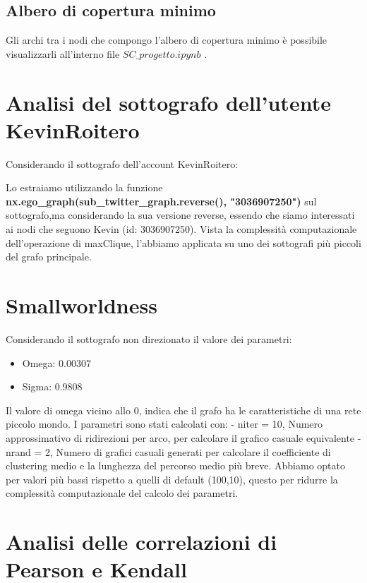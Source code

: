\documentclass[a4paper,11pt]{report}
\begin{document}
\subsection{Albero di copertura minimo}
Gli archi tra i nodi che compongo l'albero di copertura minimo è possibile visualizzarli all'interno file $SC\_progetto.ipynb$ .

\section{Analisi del sottografo dell'utente KevinRoitero}
Considerando il sottografo dell'account KevinRoitero:

Lo estraiamo utilizzando la funzione \textbf{nx.ego\_graph(sub\_twitter\_graph.reverse(), "3036907250")} sul sottografo,ma considerando la sua versione reverse, essendo che siamo interessati ai nodi che seguono Kevin (id: 3036907250).
Vista la complessità computazionale dell'operazione di maxClique, l'abbiamo applicata su uno dei sottografi più piccoli del grafo principale. 

\section{Smallworldness}
Considerando il sottografo non direzionato il valore dei parametri:
	\begin{itemize}
	\item Omega: 0.00307
	\item Sigma: 0.9808
\end{itemize}
Il valore di omega vicino allo 0, indica che il grafo ha le caratteristiche di una rete piccolo mondo.
I parametri sono stati calcolati con:\newline
- niter = 10, Numero approssimativo di ridirezioni per arco, per calcolare il grafico casuale equivalente\newline
- nrand = 2, Numero di grafici casuali generati per calcolare il coefficiente di clustering medio e la lunghezza del percorso medio più breve.\newline
Abbiamo optato per valori più bassi rispetto a quelli di default (100,10), questo per ridurre la complessità computazionale del calcolo dei parametri.
\pagebreak
\section{Analisi delle correlazioni di Pearson e Kendall}
\end{document}
